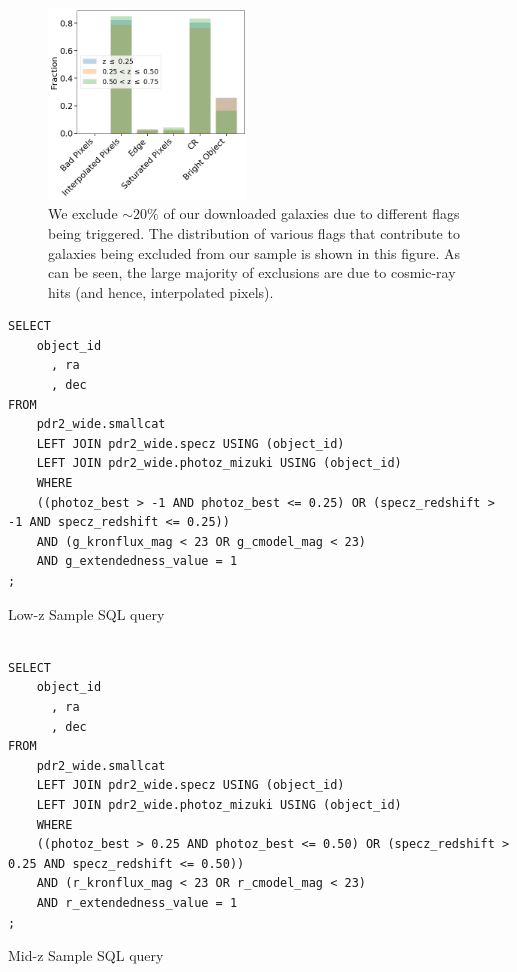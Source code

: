 \documentclass[linenumbers,twocolumn,twocolappendix]{aastex631}
\begin{document}
\begin{CJK*}{UTF8}{gbsn}
\begin{figure}[htb]
    \centering
    \includegraphics[width = 0.47\textwidth]{flag_distr.png}
    \caption{We exclude $\sim20\%$ of our downloaded galaxies due to different flags being triggered. The distribution of various flags that contribute to galaxies being excluded from our sample is shown in this figure. As can be seen, the large majority of exclusions are due to cosmic-ray hits (and hence, interpolated pixels). }
    \label{fig:flag_distr}
\end{figure}

\begin{listing}[H]
\begin{verbatim}
SELECT
    object_id
      , ra
      , dec
FROM
    pdr2_wide.smallcat
    LEFT JOIN pdr2_wide.specz USING (object_id)
    LEFT JOIN pdr2_wide.photoz_mizuki USING (object_id)
    WHERE
    ((photoz_best > -1 AND photoz_best <= 0.25) OR (specz_redshift > -1 AND specz_redshift <= 0.25))
    AND (g_kronflux_mag < 23 OR g_cmodel_mag < 23)
    AND g_extendedness_value = 1
;
\end{verbatim}
\caption{Low-z Sample SQL query}
\label{code:sql_low_z}
\end{listing}

\begin{listing}[H]
\begin{verbatim}

SELECT
    object_id
      , ra
      , dec
FROM
    pdr2_wide.smallcat
    LEFT JOIN pdr2_wide.specz USING (object_id)
    LEFT JOIN pdr2_wide.photoz_mizuki USING (object_id)
    WHERE
    ((photoz_best > 0.25 AND photoz_best <= 0.50) OR (specz_redshift > 0.25 AND specz_redshift <= 0.50))
    AND (r_kronflux_mag < 23 OR r_cmodel_mag < 23)
    AND r_extendedness_value = 1
;
\end{verbatim}
\caption{Mid-z Sample SQL query}
\label{code:sql_mid_z}
\end{listing}



\end{CJK*}
\end{document}
